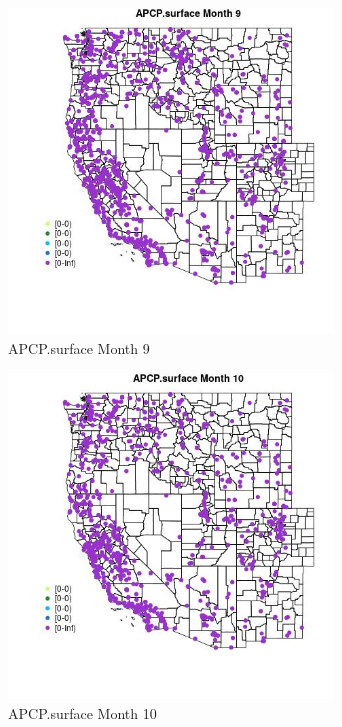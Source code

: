 \begin{figure} 
\centering  
\includegraphics[width=0.77\textwidth]{Code_Outputs/Report_ML_input_PM25_Step4_part_f_de_duplicated_aves_prioritize_24hr_obswNAs_MapObsMo9APCPsurface.jpg} 
\caption{\label{fig:Report_ML_input_PM25_Step4_part_f_de_duplicated_aves_prioritize_24hr_obswNAsMapObsMo9APCPsurface}APCP.surface Month 9} 
\end{figure} 
 

\begin{figure} 
\centering  
\includegraphics[width=0.77\textwidth]{Code_Outputs/Report_ML_input_PM25_Step4_part_f_de_duplicated_aves_prioritize_24hr_obswNAs_MapObsMo10APCPsurface.jpg} 
\caption{\label{fig:Report_ML_input_PM25_Step4_part_f_de_duplicated_aves_prioritize_24hr_obswNAsMapObsMo10APCPsurface}APCP.surface Month 10} 
\end{figure} 
 

